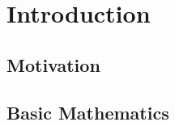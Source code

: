 \section{Introduction}
\label{sec:Introduction}

\subsection{Motivation}


\subsection{Basic Mathematics}
